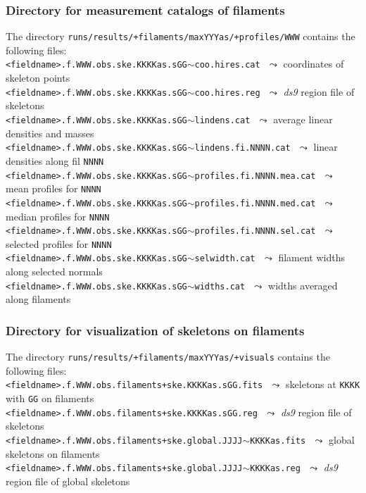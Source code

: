 \documentclass[a4paper,10pt]{article}
\begin{document}
\subsubsection{Directory for measurement catalogs of filaments}
\label{filprofiles}

The directory \verb!runs/results/+filaments/maxYYYas/+profiles/WWW! contains the following files:\\

\vspace{-2mm}\noindent
{\small\verb!<fieldname>.f.WWW.obs.ske.KKKKas.sGG!$\sim$\verb!coo.hires.cat!} $\,\,\leadsto$ coordinates of skeleton points\\
{\small\verb!<fieldname>.f.WWW.obs.ske.KKKKas.sGG!$\sim$\verb!coo.hires.reg!} $\,\,\leadsto$ \textsl{ds9} region file of skeletons\\
{\small\verb!<fieldname>.f.WWW.obs.ske.KKKKas.sGG!$\sim$\verb!lindens.cat!} $\,\,\leadsto$ average linear densities and masses\\
{\small\verb!<fieldname>.f.WWW.obs.ske.KKKKas.sGG!$\sim$\verb!lindens.fi.NNNN.cat!} $\,\,\leadsto$ linear densities along fil \verb!NNNN!\\
{\small\verb!<fieldname>.f.WWW.obs.ske.KKKKas.sGG!$\sim$\verb!profiles.fi.NNNN.mea.cat!} $\,\,\leadsto$ mean profiles for \verb!NNNN!\\
{\small\verb!<fieldname>.f.WWW.obs.ske.KKKKas.sGG!$\sim$\verb!profiles.fi.NNNN.med.cat!} $\,\,\leadsto$ median profiles for \verb!NNNN!\\
{\small\verb!<fieldname>.f.WWW.obs.ske.KKKKas.sGG!$\sim$\verb!profiles.fi.NNNN.sel.cat!} $\,\,\leadsto$ selected profiles for \verb!NNNN!\\
{\small\verb!<fieldname>.f.WWW.obs.ske.KKKKas.sGG!$\sim$\verb!selwidth.cat!} $\,\,\leadsto$ filament widths along selected normals\\
{\small\verb!<fieldname>.f.WWW.obs.ske.KKKKas.sGG!$\sim$\verb!widths.cat!} $\,\,\leadsto$ widths averaged along filaments

\subsubsection{Directory for visualization of skeletons on filaments}
\label{filvisuals}

The directory \verb!runs/results/+filaments/maxYYYas/+visuals! contains the following files:\\

\vspace{-2mm}\noindent
{\small\verb!<fieldname>.f.WWW.obs.filaments+ske.KKKKas.sGG.fits!} $\,\,\leadsto$ skeletons at \verb!KKKK! with \verb!GG! on filaments\\
{\small\verb!<fieldname>.f.WWW.obs.filaments+ske.KKKKas.sGG.reg!} $\,\,\leadsto$ \textsl{ds9} region file of skeletons\\
{\small\verb!<fieldname>.f.WWW.obs.filaments+ske.global.JJJJ!$\sim$\verb!KKKKas.fits!} $\,\,\leadsto$ global skeletons on filaments\\
{\small\verb!<fieldname>.f.WWW.obs.filaments+ske.global.JJJJ!$\sim$\verb!KKKKas.reg!} $\,\,\leadsto$ \textsl{ds9} region file of global skeletons
\end{document}
